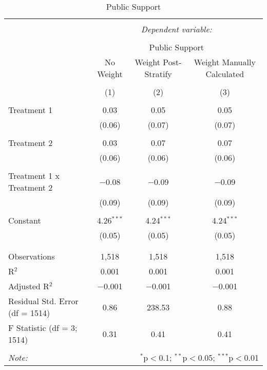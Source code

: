
\begin{table}[!htbp] \centering 
  \caption{Public Support} 
  \label{} 
\begin{tabular}{@{\extracolsep{5pt}}lccc} 
\\[-1.8ex]\hline 
\hline \\[-1.8ex] 
 & \multicolumn{3}{c}{\textit{Dependent variable:}} \\ 
\cline{2-4} 
\\[-1.8ex] & \multicolumn{3}{c}{Public Support} \\ 
 & No Weight & Weight Post-Stratify & Weight Manually Calculated \\ 
\\[-1.8ex] & (1) & (2) & (3)\\ 
\hline \\[-1.8ex] 
 Treatment 1 & 0.03 & 0.05 & 0.05 \\ 
  & (0.06) & (0.07) & (0.07) \\ 
  & & & \\ 
 Treatment 2 & 0.03 & 0.07 & 0.07 \\ 
  & (0.06) & (0.06) & (0.06) \\ 
  & & & \\ 
 Treatment 1 x Treatment 2 & $-$0.08 & $-$0.09 & $-$0.09 \\ 
  & (0.09) & (0.09) & (0.09) \\ 
  & & & \\ 
 Constant & 4.26$^{***}$ & 4.24$^{***}$ & 4.24$^{***}$ \\ 
  & (0.05) & (0.05) & (0.05) \\ 
  & & & \\ 
\hline \\[-1.8ex] 
Observations & 1,518 & 1,518 & 1,518 \\ 
R$^{2}$ & 0.001 & 0.001 & 0.001 \\ 
Adjusted R$^{2}$ & $-$0.001 & $-$0.001 & $-$0.001 \\ 
Residual Std. Error (df = 1514) & 0.86 & 238.53 & 0.88 \\ 
F Statistic (df = 3; 1514) & 0.31 & 0.41 & 0.41 \\ 
\hline 
\hline \\[-1.8ex] 
\textit{Note:}  & \multicolumn{3}{r}{$^{*}$p$<$0.1; $^{**}$p$<$0.05; $^{***}$p$<$0.01} \\ 
\end{tabular} 
\end{table} 
